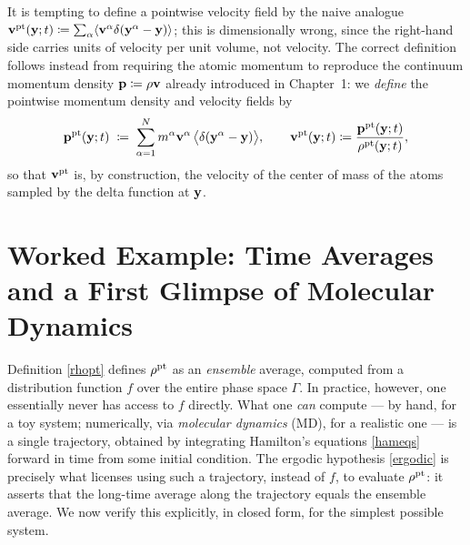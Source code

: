 \begin{remark}
	It is tempting to define a pointwise velocity field by the naive analogue $\mathbf{v}^{\rm pt}(\mathbf{y};t)\coloneqq\sum_\alpha\langle\mathbf{v}^\alpha\delta(\mathbf{y}^\alpha-\mathbf{y})\rangle$; this is dimensionally wrong, since the right-hand side carries units of velocity per unit volume, not velocity. The correct definition follows instead from requiring the atomic momentum to reproduce the continuum momentum density $\mathbf{p}\coloneqq\rho\mathbf{v}$ already introduced in Chapter~1: we \textit{define} the pointwise momentum density and velocity fields by
	\begin{equation}\label{ppt}
		\mathbf{p}^{\rm pt}(\mathbf{y};t) \;\coloneqq\; \sum_{\alpha=1}^N m^\alpha\mathbf{v}^\alpha\,\big\langle\delta(\mathbf{y}^\alpha-\mathbf{y})\big\rangle, \qquad \mathbf{v}^{\rm pt}(\mathbf{y};t)\coloneqq\frac{\mathbf{p}^{\rm pt}(\mathbf{y};t)}{\rho^{\rm pt}(\mathbf{y};t)},
	\end{equation}
	so that $\mathbf{v}^{\rm pt}$ is, by construction, the velocity of the center of mass of the atoms sampled by the delta function at $\mathbf{y}$.
\end{remark}

\section{Worked Example: Time Averages and a First Glimpse of Molecular Dynamics}\label{sec:ho_example}

Definition \eqref{rhopt} defines $\rho^{\rm pt}$ as an \textit{ensemble} average, computed from a distribution function $f$ over the entire phase space $\Gamma$. In practice, however, one essentially never has access to $f$ directly. What one \textit{can} compute --- by hand, for a toy system; numerically, via \textit{molecular dynamics} (MD), for a realistic one --- is a single trajectory, obtained by integrating Hamilton's equations \eqref{hameqs} forward in time from some initial condition. The ergodic hypothesis \eqref{ergodic} is precisely what licenses using such a trajectory, instead of $f$, to evaluate $\rho^{\rm pt}$: it asserts that the long-time average along the trajectory equals the ensemble average. We now verify this explicitly, in closed form, for the simplest possible system.

